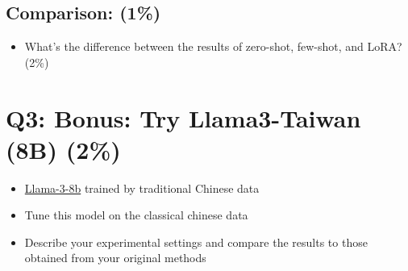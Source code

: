 \documentclass{article}
\begin{document}
\subsection{Comparison: (1\%)}
\begin{itemize}
    \item What's the difference between the results of zero-shot, few-shot, and LoRA? (2\%)
\end{itemize}

\section{Q3: Bonus: Try Llama3-Taiwan (8B) (2\%)}
\begin{itemize}
    \item \href{https://huggingface.co/yentinglin/Llama-3.1-Taiwan-8B}{Llama-3-8b} trained by traditional Chinese data
    \item Tune this model on the classical chinese data
    \item Describe your experimental settings and compare the results to those obtained from your original methods
\end{itemize}
\end{document}
